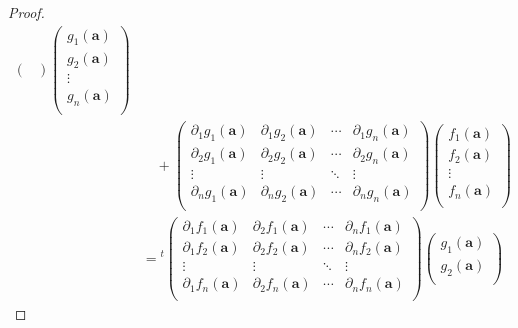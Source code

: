 \documentclass[dvipdfmx]{jsarticle}
\begin{document}
\begin{proof}
\begin{align*}
\begin{pmatrix}
\end{pmatrix}\begin{pmatrix}
g_{1}\left( \mathbf{a} \right) \\
g_{2}\left( \mathbf{a} \right) \\
 \vdots \\
g_{n}\left( \mathbf{a} \right) \\
\end{pmatrix} \\
&\quad + \begin{pmatrix}
\partial_{1}g_{1}\left( \mathbf{a} \right) & \partial_{1}g_{2}\left( \mathbf{a} \right) & \cdots & \partial_{1}g_{n}\left( \mathbf{a} \right) \\
\partial_{2}g_{1}\left( \mathbf{a} \right) & \partial_{2}g_{2}\left( \mathbf{a} \right) & \cdots & \partial_{2}g_{n}\left( \mathbf{a} \right) \\
 \vdots & \vdots & \ddots & \vdots \\
\partial_{n}g_{1}\left( \mathbf{a} \right) & \partial_{n}g_{2}\left( \mathbf{a} \right) & \cdots & \partial_{n}g_{n}\left( \mathbf{a} \right) \\
\end{pmatrix}\begin{pmatrix}
f_{1}\left( \mathbf{a} \right) \\
f_{2}\left( \mathbf{a} \right) \\
 \vdots \\
f_{n}\left( \mathbf{a} \right) \\
\end{pmatrix}\\
&={}^{t}\begin{pmatrix}
\partial_{1}f_{1}\left( \mathbf{a} \right) & \partial_{2}f_{1}\left( \mathbf{a} \right) & \cdots & \partial_{n}f_{1}\left( \mathbf{a} \right) \\
\partial_{1}f_{2}\left( \mathbf{a} \right) & \partial_{2}f_{2}\left( \mathbf{a} \right) & \cdots & \partial_{n}f_{2}\left( \mathbf{a} \right) \\
 \vdots & \vdots & \ddots & \vdots \\
\partial_{1}f_{n}\left( \mathbf{a} \right) & \partial_{2}f_{n}\left( \mathbf{a} \right) & \cdots & \partial_{n}f_{n}\left( \mathbf{a} \right) \\
\end{pmatrix}\begin{pmatrix}
g_{1}\left( \mathbf{a} \right) \\
g_{2}\left( \mathbf{a} \right) \\

\end{pmatrix}
\end{align*}
\end{proof}
\end{document}
